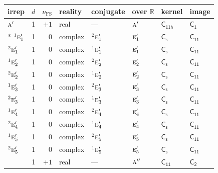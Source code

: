 \documentclass[10pt,a4paper]{article}
\numberwithin{equation}{section}
\newcommand{\grp}[1]{\mathsf{#1}}
\newcommand{\irr}[1]{\text{\normalfont\scshape #1}}
\newcommand{\conjpair}[1]{{}^{#1}}
\newcommand{\detbox}[1]{{\setlength{\fboxsep}{1pt}\fbox{#1}}}
\newcommand{\fsind}{\nu_{\mathrm{FS}}}
\begin{document}
{\small\renewcommand{\arraystretch}{1.25}\setlength{\tabcolsep}{4pt}\begin{longtable}{@{}lrrlllll@{}}\toprule
irrep & $d$ & $\fsind$ & reality & conjugate & over $\mathbb{R}$ & kernel & image\\\midrule\endhead
\bottomrule\endfoot\endlastfoot
$\irr{a}'$ & 1 & $+1$ & real & --- & $\irr{a}'$ & \href{C11h.pdf}{$\grp{C_{11h}}$} & \href{C1.pdf}{$\grp{C_{1}}$}\\*
$\conjpair{1}\irr{e}_{1}'$ & 1 & $0$ & complex & $\conjpair{2}\irr{e}_{1}'$ & $\irr{e}_{1}'$ & \href{C1v.pdf}{$\grp{C_{s}}$} & \href{C11.pdf}{$\grp{C_{11}}$}\\
$\conjpair{2}\irr{e}_{1}'$ & 1 & $0$ & complex & $\conjpair{1}\irr{e}_{1}'$ & $\irr{e}_{1}'$ & \href{C1v.pdf}{$\grp{C_{s}}$} & \href{C11.pdf}{$\grp{C_{11}}$}\\
$\conjpair{1}\irr{e}_{2}'$ & 1 & $0$ & complex & $\conjpair{2}\irr{e}_{2}'$ & $\irr{e}_{2}'$ & \href{C1v.pdf}{$\grp{C_{s}}$} & \href{C11.pdf}{$\grp{C_{11}}$}\\
$\conjpair{2}\irr{e}_{2}'$ & 1 & $0$ & complex & $\conjpair{1}\irr{e}_{2}'$ & $\irr{e}_{2}'$ & \href{C1v.pdf}{$\grp{C_{s}}$} & \href{C11.pdf}{$\grp{C_{11}}$}\\
$\conjpair{1}\irr{e}_{3}'$ & 1 & $0$ & complex & $\conjpair{2}\irr{e}_{3}'$ & $\irr{e}_{3}'$ & \href{C1v.pdf}{$\grp{C_{s}}$} & \href{C11.pdf}{$\grp{C_{11}}$}\\
$\conjpair{2}\irr{e}_{3}'$ & 1 & $0$ & complex & $\conjpair{1}\irr{e}_{3}'$ & $\irr{e}_{3}'$ & \href{C1v.pdf}{$\grp{C_{s}}$} & \href{C11.pdf}{$\grp{C_{11}}$}\\
$\conjpair{1}\irr{e}_{4}'$ & 1 & $0$ & complex & $\conjpair{2}\irr{e}_{4}'$ & $\irr{e}_{4}'$ & \href{C1v.pdf}{$\grp{C_{s}}$} & \href{C11.pdf}{$\grp{C_{11}}$}\\
$\conjpair{2}\irr{e}_{4}'$ & 1 & $0$ & complex & $\conjpair{1}\irr{e}_{4}'$ & $\irr{e}_{4}'$ & \href{C1v.pdf}{$\grp{C_{s}}$} & \href{C11.pdf}{$\grp{C_{11}}$}\\
$\conjpair{1}\irr{e}_{5}'$ & 1 & $0$ & complex & $\conjpair{2}\irr{e}_{5}'$ & $\irr{e}_{5}'$ & \href{C1v.pdf}{$\grp{C_{s}}$} & \href{C11.pdf}{$\grp{C_{11}}$}\\
$\conjpair{2}\irr{e}_{5}'$ & 1 & $0$ & complex & $\conjpair{1}\irr{e}_{5}'$ & $\irr{e}_{5}'$ & \href{C1v.pdf}{$\grp{C_{s}}$} & \href{C11.pdf}{$\grp{C_{11}}$}\\
\detbox{$\irr{a}''$} & 1 & $+1$ & real & --- & $\irr{a}''$ & \href{C11.pdf}{$\grp{C_{11}}$} & \href{C2.pdf}{$\grp{C_{2}}$}\\

\end{longtable}}
\end{document}
